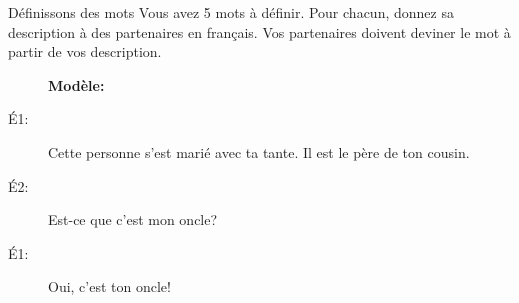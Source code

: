 \begin{frame}{Définissons des mots}
  Vous avez 5 mots à définir.
  Pour chacun, donnez sa description à des partenaires \alert{en français}.
  Vos partenaires doivent deviner le mot à partir de vos description.
  \begin{description}
    \item[] \textbf{Modèle:} 
    \item[É1:] Cette personne s'est marié avec ta tante. Il est le père de ton cousin.
    \item[É2:] Est-ce que c'est mon oncle?
    \item[É1:] Oui, c'est ton oncle!
  \end{description}
\end{frame}